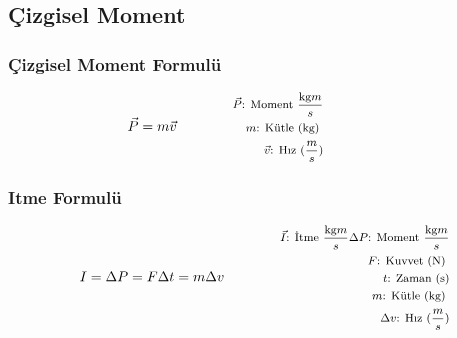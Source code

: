 \subsection{Çizgisel Moment}

\subsubsection*{Çizgisel Moment Formulü}
\begin{equation}
    \vec{P} = m\vec{v} \qquad \qquad \parbox{4cm}{\footnotesize$\begin{aligned}
        \vec{P}\text{: Moment } \frac{\text{kg} m }{s} \\
        m\text{: Kütle (kg) } \\
        \vec{v}\text{: Hız } (\frac{m}{s})
\end{aligned}$}
\end{equation}

\subsubsection*{Itme Formulü}
\begin{equation}
    I = \Delta P = F\Delta t = m \Delta v \qquad \qquad \parbox{4cm}{\footnotesize$\begin{aligned}
        \vec{I}\text{: İtme } \frac{\text{kg} m }{s}
        \Delta P \text{: Moment } \frac{\text{kg} m }{s} \\
        F\text{: Kuvvet (N) } \\
        t\text{: Zaman (s)} \\
        m\text{: Kütle (kg) } \\
        \Delta v \text{: Hız } (\frac{m}{s})
\end{aligned}$}
\end{equation}

